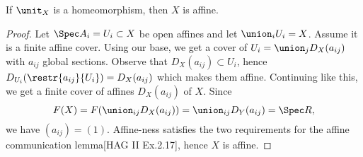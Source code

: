 \begin{lemma}
If $\unit_X$ is a homeomorphism, then $X$ is affine.
\end{lemma}

\begin{proof}
Let $\Spec A_i = U_i \subset X$ be open affines
and let $\union_i U_i = X$.
Assume it is a finite affine cover.
Using our base, 
we get a cover of $U_i = \union_j D_X(a_{ij})$ 
with $a_{ij}$ global sections.
Observe that $D_X(a_{ij})\subset U_i$, 
hence $D_{U_i}(\restr{a_{ij}}{U_i}) = D_X(a_{ij})$
which makes them affine.
Continuing like this, 
we get a finite cover of affines $D_X(a_{ij})$ of $X$.
Since 
\[ F(X) = F(\union_{ij} D_X(a_{ij})) = \union_{ij} D_Y(a_{ij}) = \Spec R,\]
we have $(a_{ij})=(1)$.
Affine-ness satisfies the two requirements for the affine communication lemma[HAG II Ex.2.17], 
hence $X$ is affine.
\end{proof}